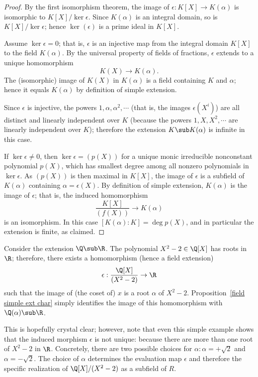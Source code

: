 \begin{proof}
By the first isomorphism theorem, the image of $\epsilon:K[X]\to K(\alpha)$ is isomorphic to $K[X]/\ker\epsilon$. Since $K(\alpha)$ is an integral domain, so is $K[X]/\ker\epsilon$; hence $\ker(\epsilon)$ is a prime ideal in $K[X]$.\par
Assume $\ker\epsilon=0$; that is, $\epsilon$ is an injective map from the integral domain $K[X]$ to the field $K(\alpha)$. By the universal property of fields of fractions, $\epsilon$ extends to a unique homomorphism
\[K(X)\to K(\alpha).\]
The (isomorphic) image of $K(X)$ in $K(\alpha)$ is a field containing $K$ and $\alpha$; hence it equals $K(\alpha)$ by definition of simple extension.\par
Since $\epsilon$ is injective, the powers $1,\alpha,\alpha^2,\cdots$ (that is, the images $\epsilon(X^i)$) are all distinct and linearly independent over $K$ (because the powers $1,X,X^2,\cdots$ are linearly independent over $K$); therefore the extension $K\sub K(\alpha)$ is infinite in this case.\par
If $\ker\epsilon\neq0$, then $\ker\epsilon=(p(X))$ for a unique monic irreducible nonconstant polynomial $p(X)$, which has smallest degree among all nonzero polynomials in $\ker\epsilon$. As $(p(X))$ is then maximal in $K[X]$, the image of $\epsilon$ is a subfield of $K(\alpha)$ containing $\alpha=\epsilon(X)$. By definition of simple extension, $K(\alpha)$ is the image of $\epsilon$; that is, the induced homomorphism
\[\dfrac{K[X]}{(f(X))}\to K(\alpha)\]
is an isomorphism. In this case $[K(\alpha):K]=\deg p(X)$, and in particular the extension is finite, as claimed.
\end{proof}
\begin{example}
Consider the extension $\Q\sub\R$. The polynomial $X^2-2\in\Q[X]$ has roots in $\R$; therefore, there exists a homomorphism (hence a field extension)
\[\epsilon:\dfrac{\Q[X]}{(X^2-2)}\to\R\]
such that the image of (the coset of) $x$ is a root $\alpha$ of $X^2-2$. Proposition~\ref{field simple ext char} simply identifies the image of this homomorphism with $\Q(\alpha)\sub\R$.\par
This is hopefully crystal clear; however, note that even this simple example shows that the induced morphism $\epsilon$ is not unique: because there are more than one root of $X^2-2$ in $\R$. Concretely, there are two possible choices for $\alpha:\alpha=+\sqrt{2}$ and $\alpha=-\sqrt{2}$. The choice of $\alpha$ determines the evaluation map $\epsilon$ and therefore the specific realization of $\Q[X]/(X^2-2)$ as a subfield of $R$.\end{example}

